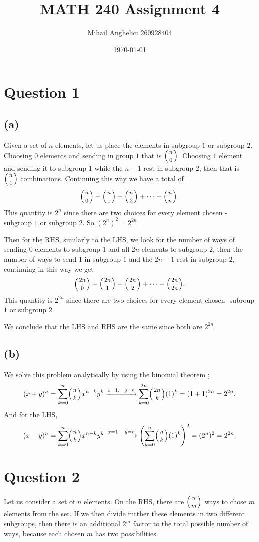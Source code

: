 \documentclass[12pt]{article}
\title{MATH 240 Assignment 4}
\author{Mihail Anghelici 260928404 }
\date{\today}
\renewcommand{\binom}{\mbinom}
\begin{document}
	\maketitle
	\section*{Question 1}
		\subsection*{(a)}
			Given a set of $n$ elements, let us place the elements in subgroup $1$ or subgroup $2$. Choosing $0$ elements and sending in group $1$ that is $\binom{n}{0}$. Choosing $1$ element and sending it to subgroup $1$ while the $n-1$ rest in subgroup $2$, then that is $\binom{n}{1}$ combinations. Continuing this way we have a total of 
			$$\binom{n}{0}+\binom{n}{1}+\binom{n}{2}+\dots +\binom{n}{n}.$$
			This quantity is $2^{n}$ since there are two choices for every element chosen - subgroup $1$ or subgroup $2$. So $(2^{n})^{2} = 2^{2n}$.
			
			
			Then for the RHS, similarly to the LHS, we look for the number of ways of sending $0$ elements to subgroup $1$ and all $2n$ elements to subgroup $2$, then the number of ways to send $1$ in subgroup $1$ and the $2n-1$ rest in subgroup $2$, continuing in this way we get 
				$$ \binom{2n}{0}+\binom{2n}{1}+\binom{2n}{2}+\dots +\binom{2n}{2n}.$$
			This quantity is $2^{2n}$ since there are two choices for every element chosen- subroup $1$ or subgroup $2$.
			
			We conclude that the LHS and RHS are the same since both are $2^{2n}$.
		\subsection*{(b)}
			We solve this problem analytically by using the binomial theorem ; 
			$$ (x+y)^{n} = \sum_{k=0}^{n} \binom{n}{k}x^{n-k}y^{k} \xrightarrow{x=1, \ \ y =r }  \sum_{k=0}^{2n}\binom{2n}{k}(1)^{k} = (1+1)^{2n} = 2^{2n}.$$
			And for the LHS, 
			$$ (x+y)^{n} = \sum_{k=0}^{n} \binom{n}{k}x^{n-k}y^{k} \xrightarrow{x=1, \ \ y =r } \left(\sum_{k=0}^{n}\binom{n}{k}(1)^{k}\right)^{2} = (2^{n})^{2} = 2^{2n}.$$
	\section*{Question 2}
		Let us consider a set of $n$ elements. On the RHS, there are $\binom{n}{m}$ ways to chose $m$ elements from the set. If we then divide further these elements in two different subgroups, then there is an additional $2^{m}$ factor to the total possible number of ways, because each chosen $m$ has two possibilities. 
		
\end{document}
